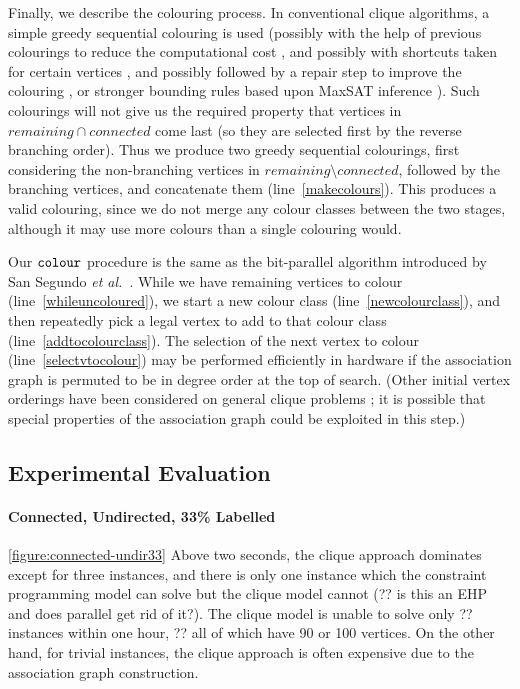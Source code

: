 \documentclass{llncs}
\newcommand{\lineref}[1]{line~\ref{#1}}
\begin{document}
Finally, we describe the colouring process. In conventional clique algorithms, a simple greedy
sequential colouring is used (possibly with the help of previous colourings to reduce the
computational cost \cite{DBLP:conf/lion/NikolaevBS15}, and possibly with shortcuts taken for certain
vertices \cite{DBLP:journals/cor/SegundoT14}, and possibly followed by a repair step to
improve the colouring \cite{DBLP:conf/walcom/TomitaSHTW10}, or stronger bounding rules based upon
MaxSAT inference \cite{DBLP:conf/ictai/LiFX13,DBLP:conf/lion/LiJX15,DBLP:journals/cor/SegundoNB15}).
Such colourings will not give us the required property that vertices in $\mathit{remaining} \cap
\mathit{connected}$ come last (so they are selected first by the reverse branching order). Thus we
produce two greedy sequential colourings, first considering the non-branching vertices in
$\mathit{remaining} \setminus \mathit{connected}$, followed by the branching vertices, and
concatenate them (\lineref{makecolours}). This produces a valid colouring, since we do not merge any
colour classes between the two stages, although it may use more colours than a single colouring
would.

Our $\FuncSty{colour}$ procedure is the same as the bit-parallel algorithm introduced by San Segundo
\textit{et al.}\ \cite{DBLP:journals/cor/SegundoRJ11}. While we have remaining vertices to colour
(\lineref{whileuncoloured}), we start a new colour class (\lineref{newcolourclass}), and then
repeatedly pick a legal vertex to add to that colour class (\lineref{addtocolourclass}).  The
selection of the next vertex to colour (\lineref{selectvtocolour}) may be performed efficiently in
hardware if the association graph is permuted to be in degree order at the top of search. (Other
initial vertex orderings have been considered on general clique problems
\cite{DBLP:journals/algorithms/Prosser12,DBLP:conf/lion/SegundoLB14}; it is possible that special
properties of the association graph could be exploited in this step.)

\subsection{Experimental Evaluation}

\paragraph{Connected, Undirected, 33\% Labelled} \cref{figure:connected-undir33} Above two seconds,
    the clique approach dominates except for three instances, and there is only one instance which
    the constraint programming model can solve but the clique model cannot (?? is this an EHP and does parallel get rid
    of it?). The clique model is unable to solve only ??  instances within one hour, ?? all of which
    have 90 or 100 vertices.  On the other hand, for trivial instances, the clique approach is often
    expensive due to the association graph construction.
\end{document}
